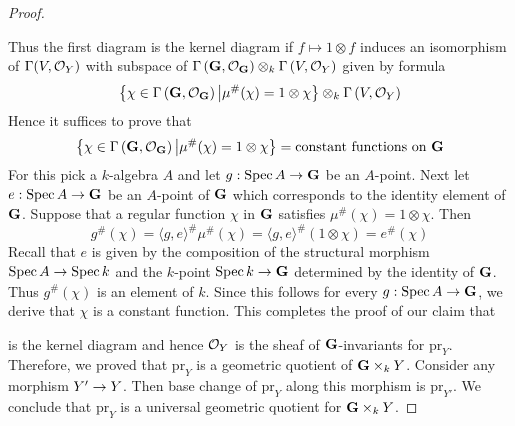\begin{proof}
\begin{center}
\end{center}
Thus the first diagram is the kernel diagram if $f\mapsto 1\otimes f$ induces an isomorphism of $\Gamma(V,{\mathcal O}_Y)$ with subspace of $\Gamma\left(\mathbf{G},{\mathcal O}_{\mathbf{G}}\right)\otimes_k\Gamma\left(V,{\mathcal O}_Y\right)$ given by formula
$$\big\{ \chi \in \Gamma\left(\mathbf{G},{\mathcal O}_{\mathbf{G}}\right)\big|\mu^{\#}(\chi) = 1 \otimes \chi\big\}\otimes_k\Gamma\left(V,{\mathcal O}_Y\right)$$
Hence it suffices to prove that 
$$\big\{ \chi \in \Gamma\left(\mathbf{G},{\mathcal O}_{\mathbf{G}}\right)\big|\mu^{\#}(\chi) = 1 \otimes \chi\big\} = \mbox{constant functions on $\mathbf{G}$}$$
For this pick a $k$-algebra $A$ and let $g:\mathrm{Spec}\, A\rightarrow \mathbf{G}$ be an $A$-point. Next let $e:\mathrm{Spec}\, A \rightarrow \mathbf{G}$ be an $A$-point of $\mathbf{G}$ which corresponds to the identity element of $\mathbf{G}$. Suppose that a regular function $\chi$ in $\mathbf{G}$ satisfies $\mu^{\#}(\chi) = 1\otimes \chi$. Then
$$g^{\#}(\chi) = \langle g, e\rangle^{\#}\mu^{\#}(\chi) =  \langle g, e\rangle^{\#}(1\otimes \chi) = e^{\#}(\chi)$$
Recall that $e$ is given by the composition of the structural morphism $\mathrm{Spec}\, A \rightarrow \mathrm{Spec}\, k$ and the $k$-point $\mathrm{Spec}\, k\rightarrow \mathbf{G}$ determined by the identity of $\mathbf{G}$. Thus $g^{\#}(\chi)$ is an element of $k$. Since this follows for every $g:\mathrm{Spec}\, A\rightarrow \mathbf{G}$, we derive that $\chi$ is a constant function. This completes the proof of our claim that 
\begin{center}
\end{center}
is the kernel diagram and hence ${\mathcal O}_Y$ is the sheaf of $\mathbf{G}$-invariants for $\mathrm{pr}_Y$. Therefore, we proved that $\mathrm{pr}_Y$ is a geometric quotient of $\mathbf{G}\times_kY$. Consider any morphism $Y' \rightarrow Y$. Then base change of $\mathrm{pr}_Y$ along this morphism is $\mathrm{pr}_{Y'}$. We conclude that $\mathrm{pr}_Y$ is a universal geometric quotient for $\mathbf{G}\times_kY$. 
\end{proof}
    
